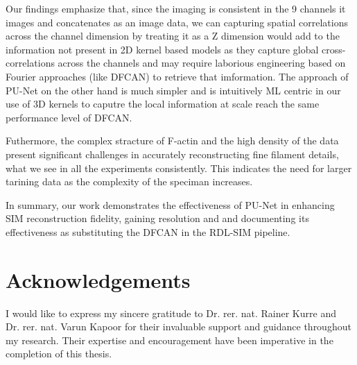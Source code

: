 \documentclass[11pt,
  paper=a4, 
  bibliography=totocnumbered,
	captions=tableheading,
	BCOR=10mm
]{scrreprt}
\theoremstyle{definition}
\begin{document}
\vspace{1cm}
\noindent
Our findings emphasize that, since the imaging is consistent in the 9 channels it images and concatenates as an image data, we can capturing spatial correlations across the channel
dimension by treating it as a Z dimension would add to the information not present in 2D kernel based models as they capture global cross-correlations across the channels 
 and may require laborious engineering based on Fourier approaches (like DFCAN) to retrieve that imformation. The approach of PU-Net on the other hand is much simpler and is intuitively
 ML centric in our use of 3D kernels to caputre the local information at scale reach the same performance level of DFCAN. 

\vspace{1cm}
\noindent
Futhermore, the complex stracture of F-actin and the high density of the data present significant challenges in accurately reconstructing 
fine filament details, what we see in all the experiments consistently. This indicates the need for larger tarining data as the complexity of the speciman increases.


\vspace{1cm}
\noindent
In summary, our work demonstrates the effectiveness of PU-Net in enhancing SIM reconstruction fidelity, gaining resolution and and documenting its effectiveness as substituting the DFCAN in the RDL-SIM pipeline.

\clearpage
\chapter*{Acknowledgements}

I would like to express my sincere gratitude to  Dr. rer. nat. Rainer Kurre and \\Dr. rer. nat. Varun Kapoor for their invaluable support and guidance throughout my research.
Their expertise and encouragement have been imperative in the completion of this thesis. 
\end{document}
